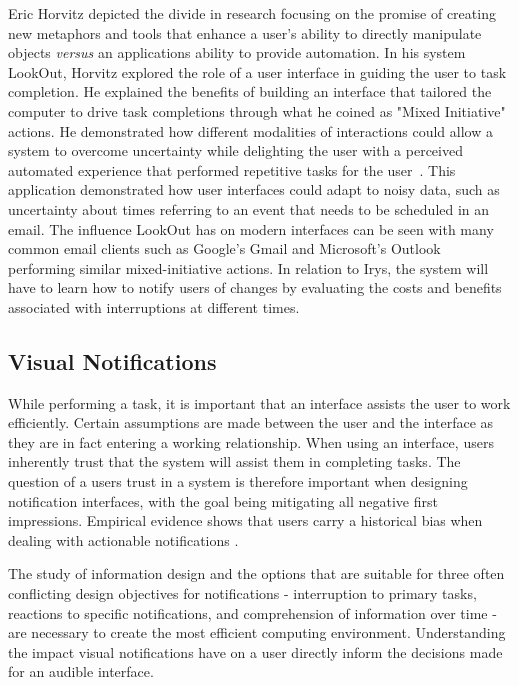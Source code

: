 Eric Horvitz depicted the divide in research focusing on the promise of creating
new metaphors and tools that enhance a user's ability to directly manipulate
objects \textit{versus} an applications ability to provide automation. In his
system LookOut, Horvitz explored the role of a user interface in guiding the
user to task completion.  He explained the benefits of building an interface
that tailored the computer to drive task completions through what he coined as
"Mixed Initiative" actions.  He demonstrated how different modalities of
interactions could allow a system to overcome uncertainty while delighting the
user with a perceived automated experience that performed repetitive tasks for
the user~\cite{horvitz1999principles}.  This application demonstrated how user
interfaces could adapt to noisy data, such as uncertainty about times referring
to an event that needs to be scheduled in an email. The influence LookOut has on
modern interfaces can be seen with many common email clients such as Google's
Gmail and Microsoft's Outlook performing similar mixed-initiative actions.  In
relation to Irys, the system will have to learn how to notify users of changes
by evaluating the costs and benefits associated with interruptions at different
times.



\subsection{                  Visual Notifications                           }

While performing a task, it is important that an interface assists the user to
work efficiently. Certain assumptions are made between the user and the interface
as they are in fact entering a working relationship.  When using an interface,
users inherently trust that the system will assist them in completing tasks.
The question of a users trust in a system is therefore important when designing
notification interfaces, with the goal being mitigating all negative first
impressions.  Empirical evidence shows that users carry a historical bias when
dealing with actionable notifications \cite{leetiernan2001effective}.

The study of information design and the options that are suitable for three often
conflicting design objectives for notifications - interruption to primary tasks,
reactions to specific notifications, and comprehension of information over time
- are necessary to create the most efficient computing environment.
Understanding the impact visual notifications have on a user directly inform the
decisions made for an audible interface.

